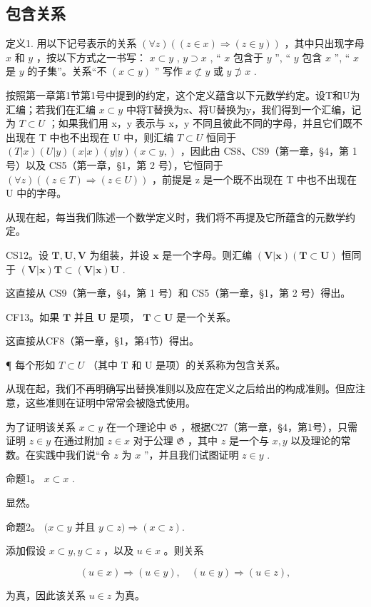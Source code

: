 \subsection{包含关系}

定义1. 用以下记号表示的关系 \((\forall z)((z \in x) \Longrightarrow (z \in y))\) ，其中只出现字母 \(x\) 和 \(y\) ，按以下方式之一书写： \(x \subset y\) , \(y \supset x\) , `` \(x\) 包含于 \(y\) '', `` \(y\) 包含 \(x\) '', `` \(x\) 是 \(y\) 的子集''。关系“不 \((x \subset y)\) '' 写作 \(x \not\subset y\) 或 \(y \not\supset x\) .

按照第一章第1节第1号中提到的约定，这个定义蕴含以下元数学约定。设T和U为汇编；若我们在汇编 \(x \subset y\) 中将T替换为x、将U替换为y，我们得到一个汇编，记为 \(T \subset U\) ；如果我们用 x，y 表示与 x，y 不同且彼此不同的字母，并且它们既不出现在 T 中也不出现在 U 中，则汇编 \(T \subset U\) 恒同于 \((T|x)(U|y)(x|x)(y|y)(x \subset y,)\) ，因此由 CS8、CS9（第一章，§4，第 1 号）以及 CS5（第一章，§1，第 2 号），它恒同于 \((\forall z)((z \in T) \Longrightarrow (z \in U))\) ，前提是 z 是一个既不出现在 T 中也不出现在 U 中的字母。

从现在起，每当我们陈述一个数学定义时，我们将不再提及它所蕴含的元数学约定。

CS12。设 \(\pmb{T},\pmb{U},\pmb{V}\) 为组装，并设 \(\pmb{x}\) 是一个字母。则汇编 \((\pmb{V}|\pmb{x})(\pmb{T}\subset \pmb{U})\) 恒同于 \((\pmb{V}|\pmb{x})\pmb{T}\subset (\pmb{V}|\pmb{x})\pmb{U}\) .

这直接从 CS9（第一章，§4，第 1 号）和 CS5（第一章，§1，第 2 号）得出。

CF13。如果 \(\pmb{T}\) 并且 \(\pmb{U}\) 是项， \(\pmb{T} \subset \pmb{U}\) 是一个关系。

这直接从CF8（第一章，§1，第4节）得出。

¶ 每个形如 \(T \subset U\) （其中 T 和 U 是项）的关系称为包含关系。

从现在起，我们不再明确写出替换准则以及应在定义之后给出的构成准则。但应注意，这些准则在证明中常常会被隐式使用。

为了证明该关系 \(x \subset y\) 在一个理论中 \(\mathfrak{G}\) ，根据C27（第一章，§4，第1号），只需证明 \(z \in y\) 在通过附加 \(z \in x\) 对于公理 \(\mathfrak{G}\) ，其中 \(z\) 是一个与 \(x, y\) 以及理论的常数。在实践中我们说“令 \(z\) 为 \(x\) ''，并且我们试图证明 \(z \in y\) .

命题1。 \(x \subset x\) .

显然。

命题2。 \((x\subset y\) 并且 \(y\subset z)\Longrightarrow (x\subset z).\)

添加假设 \(x \subset y, y \subset z\) ，以及 \(u \in x\) 。则关系

\[
(u \in x) \Longrightarrow (u \in y), \quad (u \in y) \Longrightarrow (u \in z),
\]

为真，因此该关系 \(u \in z\) 为真。

